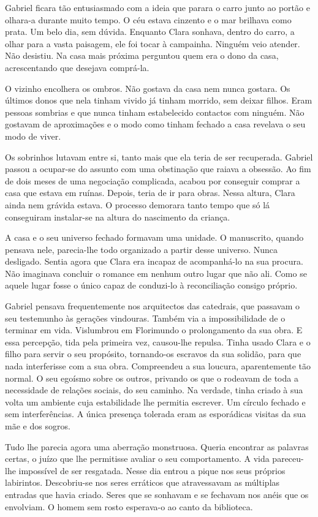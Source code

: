 Gabriel ficara tão entusiasmado com a ideia que parara o carro junto ao
portão e olhara-a durante muito tempo. O céu estava cinzento e o mar
brilhava como prata. Um belo dia, sem dúvida. Enquanto Clara sonhava,
dentro do carro, a olhar para a vasta paisagem, ele foi tocar à
campainha. Ninguém veio atender. Não desistiu. Na casa mais próxima
perguntou quem era o dono da casa, acrescentando que desejava comprá-la.

O vizinho encolhera os ombros. Não gostava da casa nem nunca gostara. Os
últimos donos que nela tinham vivido já tinham morrido, sem deixar
filhos. Eram pessoas sombrias e que nunca tinham estabelecido contactos
com ninguém. Não gostavam de aproximações e o modo como tinham fechado a
casa revelava o seu modo de viver.

Os sobrinhos lutavam entre si, tanto mais que ela teria de ser
recuperada. Gabriel passou a ocupar-se do assunto com uma obstinação que
raiava a obsessão. Ao fim de dois meses de uma negociação complicada,
acabou por conseguir comprar a casa que estava em ruínas. Depois, teria
de ir para obras. Nessa altura, Clara ainda nem grávida estava. O
processo demorara tanto tempo que só lá conseguiram instalar-se na
altura do nascimento da criança.

A casa e o seu universo fechado formavam uma unidade. O manuscrito,
quando pensava nele, parecia-lhe todo organizado a partir desse
universo. Nunca desligado. Sentia agora que Clara era incapaz de
acompanhá-lo na sua procura. Não imaginava concluir o romance em nenhum
outro lugar que não ali. Como se aquele lugar fosse o único capaz de
conduzi-lo à reconciliação consigo próprio.

Gabriel pensava frequentemente nos arquitectos das catedrais, que
passavam o seu testemunho às gerações vindouras. Também via a
impossibilidade de o terminar em vida. Vislumbrou em Florimundo o
prolongamento da sua obra. E essa percepção, tida pela primeira vez,
causou-lhe repulsa. Tinha usado Clara e o filho para servir o seu
propósito, tornando-os escravos da sua solidão, para que nada
interferisse com a sua obra. Compreendeu a sua loucura, aparentemente
tão normal. O seu egoísmo sobre os outros, privando os que o rodeavam de
toda a necessidade de relações sociais, do seu caminho. Na verdade,
tinha criado à sua volta um ambiente cuja estabilidade lhe permitia
escrever. Um círculo fechado e sem interferências. A única presença
tolerada eram as esporádicas visitas da sua mãe e dos sogros.

Tudo lhe parecia agora uma aberração monstruosa. Queria encontrar as
palavras certas, o juízo que lhe permitisse avaliar o seu comportamento.
A vida pareceu-lhe impossível de ser resgatada. Nesse dia entrou a pique
nos seus próprios labirintos. Descobriu-se nos seres erráticos que
atravessavam as múltiplas entradas que havia criado. Seres que se
sonhavam e se fechavam nos anéis que os envolviam. O homem sem rosto
esperava-o ao canto da biblioteca.

